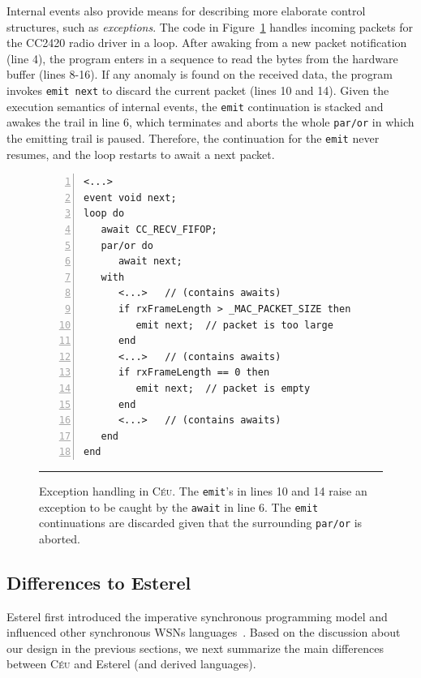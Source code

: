 \documentclass[letterpaper]{sig-alternate}
\newcommand{\code}[1] {{\small{\texttt{#1}}}}
\newcommand{\CEU}{\textsc{C\'{e}u}\xspace}
\begin{document}
Internal events also provide means for describing more elaborate control 
structures, such as \emph{exceptions}.
The code in Figure~\ref{lst.exception} handles incoming packets for the CC2420 
radio driver in a loop.
After awaking from a new packet notification (line 4), the program enters in a 
sequence to read the bytes from the hardware buffer (lines 8-16).
If any anomaly is found on the received data, the program invokes 
\code{emit~next} to discard the current packet (lines 10 and 14).
Given the execution semantics of internal events, the \code{emit} continuation 
is stacked and awakes the trail in line 6, which terminates and aborts the 
whole \code{par/or} in which the emitting trail is paused.
Therefore, the continuation for the \code{emit} never resumes, and the loop 
restarts to await a next packet.


\begin{figure}[t]
\begin{lstlisting}[numbers=left,xleftmargin=2.5em]
<...>
event void next;
loop do
   await CC_RECV_FIFOP;
   par/or do
      await next;
   with
      <...>   // (contains awaits)
      if rxFrameLength > _MAC_PACKET_SIZE then
         emit next;  // packet is too large
      end
      <...>   // (contains awaits)
      if rxFrameLength == 0 then
         emit next;  // packet is empty
      end
      <...>   // (contains awaits)
   end
end
\end{lstlisting}
\rule{8.5cm}{0.37pt}
\caption{ Exception handling in \CEU. \newline
{\small
The \code{emit}'s in lines 10 and 14 raise an exception to be caught by the 
\code{await} in line 6.
The \code{emit} continuations are discarded given that the surrounding 
\code{par/or} is aborted.
}
\label{lst.exception}
}
\end{figure}

\subsection{Differences to Esterel}

Esterel first introduced the imperative synchronous programming model and 
influenced other synchronous WSNs languages~\cite{wsn.sol,wsn.osm}.
%
Based on the discussion about our design in the previous sections, we next 
summarize the main differences between \CEU and Esterel (and derived 
languages).
\end{document}
